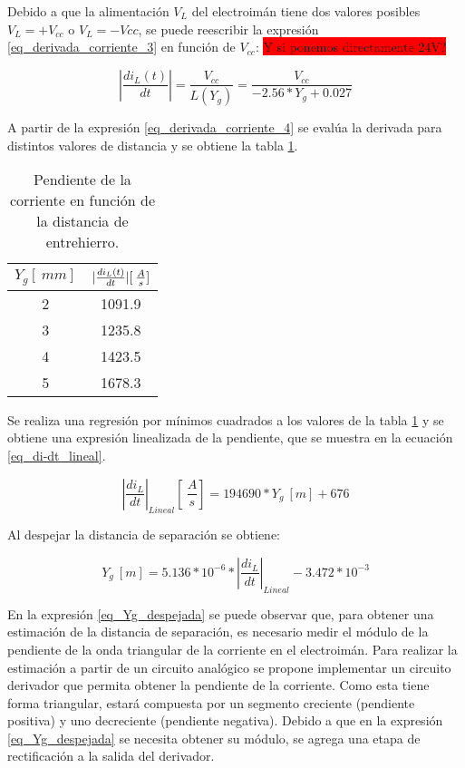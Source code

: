 Debido a que la alimentación $V_L$ del electroimán tiene dos valores posibles $V_L=+V_{cc}$ o $V_L=-V{cc}$, se puede reescribir la expresión \ref{eq_derivada_corriente_3} en función de $V_{cc}$:
\colorbox{red}{Y si ponemos directamente 24V?}

\begin{equation} \label{eq_derivada_corriente_4}
	\left|\frac{di_L(t)}{dt}\right|= \frac{V_{cc}}{L(Y_g)}=\frac{V_{cc}}{-2.56*Y_{g}+0.027}
\end{equation}

A partir de la expresión \ref{eq_derivada_corriente_4} se evalúa la derivada para distintos valores de distancia y se obtiene la tabla \ref{tab_derivada_linealizada}.

\begin{table}[H]
	\begin{center}
		\begin{tabular}{| c | c |}
			\hline
			$Y_g[\:mm]$ & $\lvert\frac{di_L(t)}{dt}\rvert [\:\frac{A}{s}]$\\ \hline
			2 & 1091.9 \\ \hline 
			3 & 1235.8 \\ \hline 
			4 & 1423.5 \\ \hline 
			5 & 1678.3 \\ \hline 
		\end{tabular}
		\caption{Pendiente de la corriente en función de la distancia de entrehierro.}
		\label{tab_derivada_linealizada}
	\end{center}
\end{table}

Se realiza una regresión por mínimos cuadrados a los valores de la tabla \ref{tab_derivada_linealizada} y se obtiene una expresión linealizada de la pendiente, que se  muestra en la ecuación \ref{eq_di-dt_lineal}.


\begin{equation} \label{eq_di-dt_lineal}
	{\left|\frac{di_L}{dt}\right|}_{Lineal}[\:\frac{A}{s}]= 194690 * Y_g\:[m]+676
\end{equation}

Al despejar la distancia de separación se obtiene:

\begin{equation} \label{eq_Yg_despejada}
	Y_g\:[m] =5.136*10^{-6}*{\left|\frac{di_L}{dt}\right|}_{Lineal} - 3.472*10^{-3}
\end{equation}


En la expresión \ref{eq_Yg_despejada} se puede observar que, para obtener una estimación de la distancia de separación, es necesario medir el módulo de la pendiente de la onda triangular de la corriente en el electroimán. Para realizar la estimación a partir de un circuito analógico se propone implementar un circuito derivador que permita obtener la pendiente de la corriente. Como esta tiene forma triangular, estará compuesta por un segmento creciente (pendiente positiva) y uno decreciente (pendiente negativa). Debido a que en la expresión \ref{eq_Yg_despejada} se necesita obtener su módulo, se agrega una etapa de rectificación a la salida del derivador.

